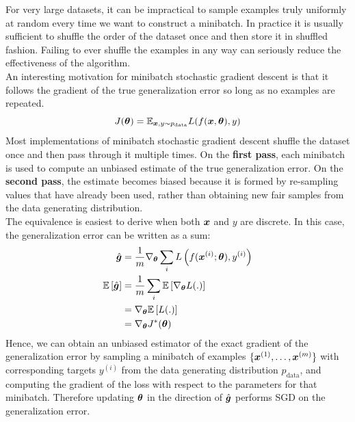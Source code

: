 \begin{multicols}{2}
	For very large datasets, it can be impractical to sample examples truly uniformly at random every time we want to construct a minibatch.
	In practice it is usually sufficient to shuffle the order of the dataset once and then store it in shuffled fashion.
	Failing to ever shuffle the examples in any way can seriously reduce the effectiveness of the algorithm.\\
	
	An interesting motivation for minibatch stochastic gradient descent is that it follows the gradient of the true generalization error so long as no examples are repeated.
	\[ J(\bol{\theta}) = \Exp_{\bol{x},y\sim p_{\text{data}}} L(f(\vx,\bol{\theta}),y) \]
	Most implementations of minibatch stochastic gradient descent shuffle the dataset once and then pass through it multiple times.
	On the \textbf{first pass}, each minibatch is used to compute an unbiased estimate of the true generalization error.
	On the \textbf{second pass}, the estimate becomes biased because it is formed by re-sampling values that have already been used, rather than obtaining new fair samples from the data generating distribution.\\
	
	The equivalence is easiest to derive when both ${\bm{x}}$ and $y$ are discrete. In this case, the generalization error can be written as a sum:
	\begin{align*}
	\hat{\bol{g}} &= \frac{1}{m}\nabla_\bolt \sum_i L\left(f(\vx^{(i)};\bolt),y^{(i)}\right)\\
	\Exp\left[\hat{\bol{g}}\right] &= \frac{1}{m} \sum_i \Exp\left[\nabla_\bolt L(.)\right]\\
	&= \nabla_\bolt \Exp\left[L(.)\right]\\
	&= \nabla_\bolt J^\ast (\bolt)
	\end{align*}
	Hence, we can obtain an unbiased estimator of the exact gradient of the generalization error by sampling a minibatch of examples $\{{\bm{x}}^{(1)},\dots,{\bm{x}}^{(m)}\}$ with corresponding targets $y^{(i)}$ from the data generating distribution $ p_{\text{data}} $, and computing the gradient of the loss with respect to the parameters for that minibatch. Therefore updating $\bolt$ in the direction of $\hat{\bol{g}}$ performs SGD on the generalization error.
	\newpage

\end{multicols}
